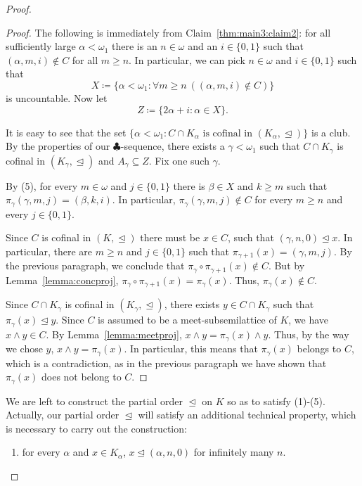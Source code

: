 \documentclass[]{amsart}
\theoremstyle{definition}
\theoremstyle{remark}
\begin{document}
\begin{proof}
\begin{proof}
The following is immediately from Claim~\ref{thm:main3:claim2}: for all sufficiently large $\alpha < \omega_1$ there is an $n \in \omega$ and an $i \in \{0,1\}$ such that $(\alpha, m, i) \not\in C$  for all $m \ge n$. In particular, we can pick $n\in\omega$ and $i \in \{0,1\}$ such that 
\[
X \coloneqq \{\alpha < \omega_1 : \forall m \ge n\ ((\alpha, m, i) \not\in C)\}
\] 
is uncountable. Now let
\[
Z \coloneqq \{2\alpha+i : \alpha \in X\}.
\]

It is easy to see that the set $\{\alpha < \omega_1 : C \cap K_\alpha \text{ is cofinal in }(K_\alpha, \trianglelefteq)\}$ is a club. By the properties of our $\clubsuit$-sequence, there exists a $\gamma < \omega_1$ such that $C \cap K_\gamma$ is cofinal in $(K_\gamma, \trianglelefteq)$ and $A_{\gamma} \subseteq Z$.  Fix one such $\gamma$.

By (5), for every $m \in \omega$ and $j \in \{0,1\}$ there is $\beta \in X$ and $k \ge m$ such that $\pi_{\gamma}(\gamma, m, j) = (\beta, k, i)$. In particular, $\pi_{\gamma}(\gamma, m, j) \not\in C$ for every $m \ge n$ and every $j \in \{0,1\}$.


Since $C$ is cofinal in $(K, \trianglelefteq)$ there must be  $x \in C$, such that $(\gamma, n, 0) \trianglelefteq x$. In particular, there are $m \ge n$ and $j \in \{0,1\}$ such that  $\pi_{\gamma+1}(x) = (\gamma, m, j)$. By the previous paragraph, we conclude that $\pi_\gamma \circ \pi_{\gamma+1} (x) \not\in C$. But by Lemma~\ref{lemma:concproj}, $\pi_\gamma \circ \pi_{\gamma+1} (x) = \pi_\gamma (x)$. Thus, $\pi_\gamma (x) \not\in C$.

Since $C \cap K_\gamma$ is cofinal in $(K_\gamma, \trianglelefteq)$, there exists $y \in C \cap K_\gamma$ such that $\pi_\gamma (x) \trianglelefteq y$. Since $C$ is assumed to be a meet-subsemilattice of $K$, we have  $x \wedge y \in C$. By Lemma~\ref{lemma:meetproj}, $x \wedge y = \pi_\gamma (x) \wedge y$. Thus, by the way we chose $y$, $x \wedge y = \pi_\gamma (x)$. In particular, this means that $\pi_\gamma (x)$ belongs to $C$, which is a contradiction, as in the previous paragraph we have shown that $\pi_\gamma (x)$ does not belong to $C$.
\end{proof}

We are left to construct the partial order $\trianglelefteq$ on $K$ so as to satisfy (1)-(5). Actually, our partial order $\trianglelefteq$ will satisfy an additional technical property, which is necessary to carry out the construction:
\begin{enumerate}
\item[(6)] for every $\alpha$ and $x \in K_\alpha$, $x \trianglelefteq (\alpha, n, 0)$ for infinitely many $n$.
\end{enumerate}


\end{proof}
\end{document}
